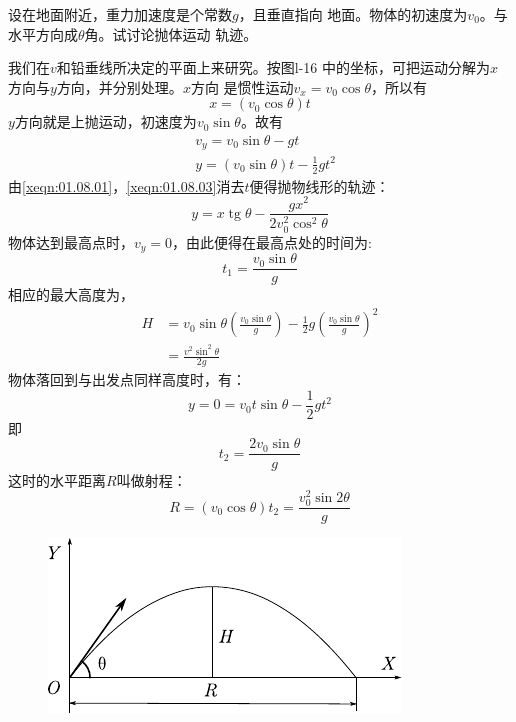 \example 设在地面附近，重力加速度是个常数$g$，且垂直指向
地面。物体的初速度为$ v_0 $。与水平方向成$ \theta $角。试讨论抛体运动
轨迹。

\discussion 我们在$ v $和铅垂线所决定的平面上来研究。按图l-16
中的坐标，可把运动分解为$ x $方向与$ y $方向，并分别处理。$ x $方向
是惯性运动$ v_x=v_0\cos\theta $，所以有
\begin{equation*}\label{xeqn:01.08.01}
    x=(v_0\cos\theta)t \tag{1}
\end{equation*}
$ y $方向就是上抛运动，初速度为$ v_0\sin\theta$。故有
\begin{align*}
\label{xeqn:01.08.02} &v_y=v_0\sin\theta-gt \tag{2} \\
\label{xeqn:01.08.03} &y=(v_0\sin\theta)t-\frac{1}{2}gt^2 \tag{3}
\end{align*}
由\eqref{xeqn:01.08.01}，\eqref{xeqn:01.08.03}消去$ t $便得抛物线形的轨迹：
\begin{equation*}\label{xeqn:01.08.04}
    y=x \operatorname{tg} \theta-\frac{g x^{2}}{2 v_{0}^{2} \cos ^{2} \theta} \tag{4}
\end{equation*}
物体达到最高点时，$ v_y=0 $，由此便得在最高点处的时间为:
\begin{equation*}
    t_{1}=\frac{v_{0} \sin \theta}{g}
\end{equation*}
相应的最大高度为，
\begin{equation*}
    \begin{aligned}
        H &=v_{0} \sin \theta\left(\frac{v_{0} \sin \theta}{g}\right)-\frac{1}{2} g\left(\frac{v_{0} \sin \theta}{g}\right)^{2} \\
        &=\frac{v^{2} \sin ^{2} \theta}{2 g}
    \end{aligned}
\end{equation*}
物体落回到与出发点同样高度时，有：
\begin{equation*}
    y=0=v_{0} t \sin \theta-\frac{1}{2} g t^{2}
\end{equation*}
\clearpage
\noindent 即\vspace{-0.8em}
\begin{equation*}
    t_{2}=\frac{2 v_{0} \sin \theta}{g}
\end{equation*}
这时的水平距离$R$叫做射程：
\begin{equation*}
    R=\left(v_{0} \cos \theta\right) t_{2}=\frac{v_{0}^{2} \sin 2 \theta}{g}
\end{equation*}
\begin{figure}
    \centering
    \includegraphics{figure/fig01.16}
    \caption{}
    \label{fig:01.16}
\end{figure}
